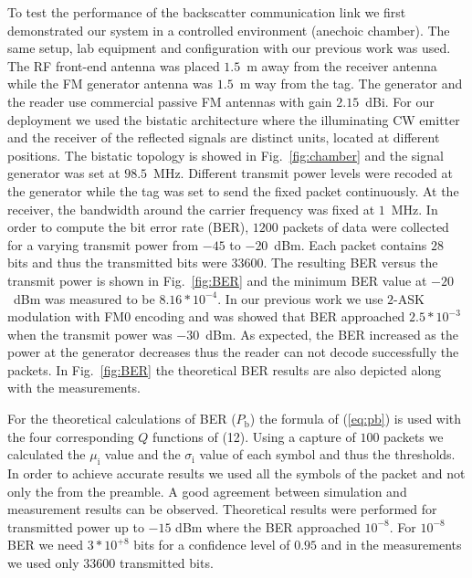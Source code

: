 \documentclass[journal]{IEEEtran}
\begin{document}
%
To test the performance of the backscatter communication link 
we first demonstrated  our system in a controlled environment (anechoic chamber). 
%
The same setup, lab equipment and configuration with our previous work \cite{daskalakis2017ambient} was used. 
%
The RF front-end antenna was placed $1.5$~m away from the receiver antenna while the FM generator  antenna was $1.5$~m way from the tag.
%
The generator and the reader use commercial passive FM antennas
with gain $2.15$~dBi.
%
For our deployment we used the bistatic architecture where the illuminating CW emitter and the receiver of the reflected signals are distinct units, located at different positions.
%
The bistatic topology is showed in Fig.~\ref{fig:chamber} and the signal generator was set at $98.5$~MHz. 
%
Different transmit power levels were recoded at the generator  while the tag was set to send the  fixed packet continuously.
%
At the receiver, the bandwidth around the carrier
frequency was fixed at $1$~MHz.
%
In order to compute the bit error rate (BER), 
$1200$ packets of data were collected for a varying transmit power from $-45$ to $-20$~dBm.
%
Each packet contains $28$ bits and thus the transmitted bits were $33600$.
%
The resulting  BER versus the transmit power is shown in  Fig.~\ref{fig:BER} and the minimum  BER value at $-20$~dBm was measured to be  $8.16*10^{-4}$. 
%
In our previous work \cite{daskalakis2017ambient} 
we use $2$-ASK modulation with FM0 encoding and was showed that  BER
approached $2.5*10^{-3}$ when the  transmit power was $-30$~dBm. 
%
%
As expected, the BER increased as the power at the generator decreases thus the reader can not decode successfully the packets.
% 
% 
%
%
In Fig.~\ref{fig:BER} the theoretical BER results are also depicted along with the measurements.




For the theoretical calculations of BER ($P_\text{b}$) the formula of (\ref{eq:pb})
is used with the  four corresponding $Q$ functions of (12).
%
Using a capture of $100$ packets we calculated the $\mu_\text{i}$ value  and the $\sigma_\text{i}$ value of each symbol and thus the thresholds. 
%
In order to achieve accurate results we used all the symbols of the packet and not only the from the preamble. 
%
%
%
A good agreement between simulation and measurement results can be observed. 
%
Theoretical  results were performed for transmitted power up to $-15$ dBm where the BER approached $10^{-8}$. 
%
For  $10^{-8}$  BER  we need $3*10^{+8}$ bits for a confidence level  of $0.95$ \cite{daskalakis2017ambient}
and  in the measurements we used only $33600$ transmitted bits.
\end{document}
